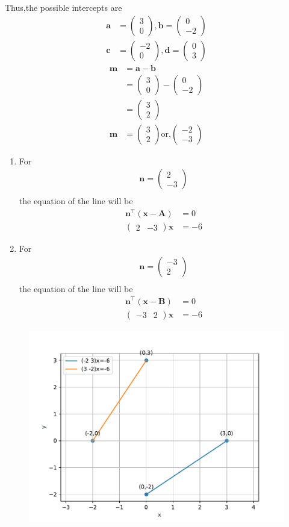 \documentclass[10pt]{article}
\providecommand{\brak}[1]{\ensuremath{\left(#1\right)}}
\newcommand{\myvec}[1]{\ensuremath{\begin{pmatrix}#1\end{pmatrix}}}
\let\vec\mathbf{}
\begin{document}
Thus,the possible intercepts are\\
\begin{align}
\vec{a}&=\myvec{3\\0},\vec{b}=\myvec{0\\-2}\\
\vec{c}&=\myvec{-2\\0},\vec{d}=\myvec{0\\3}
\end{align}
\begin{align}
\vec{m}&=\vec{a}-\vec{b}\\
&=\myvec{3\\0}-\myvec{0\\-2}\\
&=\myvec{3\\2}\\
\vec{m}&=\myvec{3\\2} \text{or,} \myvec{-2\\-3}
\end{align}
\begin{enumerate}
\item For\\
\begin{align}
\vec{n} = \myvec{ 2\\-3}\\
\end{align}
the equation of the line will be\\
\begin{align}
\vec{n}^{\top}\brak{\vec{x}-\vec{A}}&=0\\
\myvec{2&-3}\vec{x}&=-6
\end{align}
\item For\\
\begin{align}
\vec{n}=\myvec{-3\\2}\\
\end{align}
the equation of the line will be\\
\begin{align}
\vec{n}^{\top}\brak{\vec{x}-\vec{B}}&=0\\
\myvec{-3&2}\vec{x}&=-6
\end{align}
\end{enumerate}
\begin{figure}[!h]
	\begin{center}
		\includegraphics[width=\columnwidth]{./figs/fig.pdf}
	\end{center}
\caption{}
\label{figure}
\end{figure}
\end{document}
